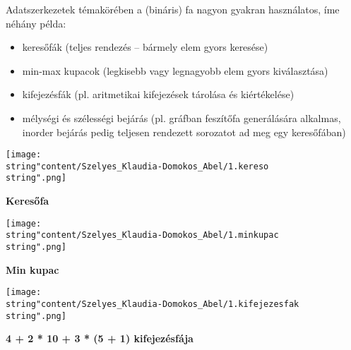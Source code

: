 Adatszerkezetek témakörében a (bináris) fa nagyon gyakran használatos,
íme néhány példa: 
\begin{itemize}
	\item keresőfák (teljes rendezés -- bármely elem gyors keresése) 
	\item min-max kupacok (legkisebb vagy legnagyobb elem gyors kiválasztása) 
	\item kifejezésfák (pl. aritmetikai kifejezések tárolása és kiértékelése) 
	\item mélységi és szélességi bejárás (pl. gráfban feszítőfa generálására
	alkalmas, inorder bejárás pedig teljesen rendezett sorozatot ad meg
	egy keresőfában) 
\end{itemize}
\begin{center}
	\begin{minipage}[c]{0.3\textwidth}%
		\centering \texttt{[image: \\string"content/Szelyes\_Klaudia-Domokos\_Abel/1.kereso\\string".png]}
		
		{\small\textbf{Keresőfa}} %
	\end{minipage}\hspace{0.05\textwidth} %
	\begin{minipage}[c]{0.3\textwidth}%
		\centering \texttt{[image: \\string"content/Szelyes\_Klaudia-Domokos\_Abel/1.minkupac\\string".png]}
		
		{\small\textbf{Min kupac}} %
	\end{minipage}
	\par\end{center}

\begin{center}
	\vspace{1em}
	\par\end{center}

\begin{center}
	\begin{minipage}[c]{0.35\textwidth}%
		\centering \texttt{[image: \\string"content/Szelyes\_Klaudia-Domokos\_Abel/1.kifejezesfak\\string".png]}
		
		{\small\textbf{4 + 2 {*} 10 + 3 {*} (5 + 1) kifejezésfája}} %
	\end{minipage}
	\par\end{center}

